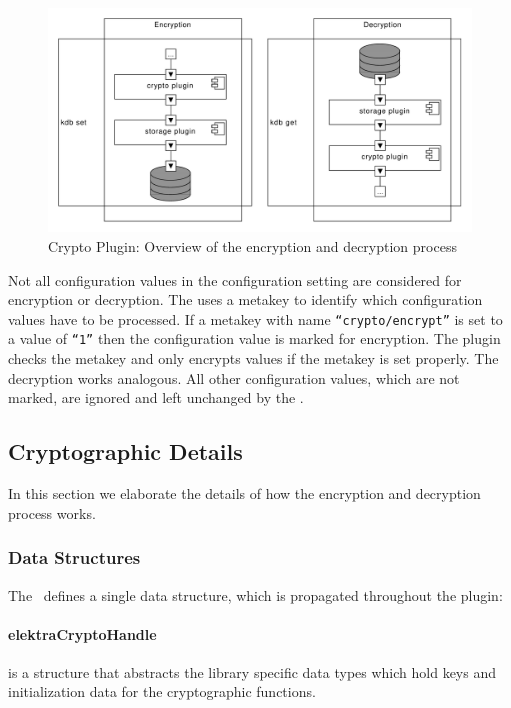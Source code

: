 \begin{figure}[h]
\center
\caption{Crypto Plugin: Overview of the encryption and decryption process}
\label{impl_crypto_overview}
\includegraphics[width=15.0cm]{umlet-figures/impl_crypto_overview.pdf}
\end{figure}

Not all configuration values in the configuration setting are considered for encryption or decryption.
The \crypto{} uses a metakey to identify which configuration values have to be processed.
If a metakey with name \texttt{``crypto/encrypt''} is set to a value of \texttt{``1''} then the configuration value is marked for encryption.
The plugin checks the metakey and only encrypts values if the metakey is set properly.
The decryption works analogous.
All other configuration values, which are not marked, are ignored and left unchanged by the \crypto.

\subsection{Cryptographic Details}

In this section we elaborate the details of how the encryption and decryption process works.

\subsubsection{Data Structures}

The \crypto ~defines a single data structure, which is propagated throughout the plugin:

\paragraph{elektraCryptoHandle} is a structure that abstracts the library specific data types which hold keys and initialization data for the cryptographic functions.

